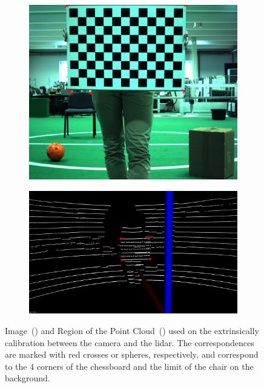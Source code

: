 \begin{figure}[!ht]
	\centering
	\begin{subfigure}[c]{0.39\textwidth}
		\includegraphics[width=\textwidth]{img/calibration/camera-extrinsic-calibration-points-draw.jpg}
		\caption{}
		\label{fig:extrinsic-calibration-correspondences:camera}
	\end{subfigure}
	\qquad
	\begin{subfigure}[c]{0.55\textwidth}
		\includegraphics[width=\textwidth]{img/calibration/lidar-extrinsic-calibration-points.png}
		\caption{}
		\label{fig:extrinsic-calibration-correspondences:lidar}
	\end{subfigure}
	\caption[Correspondences selected on the image and point cloud for extrinsic calibration between the two.]{Image~() and Region of the Point Cloud~() used on the extrinsically calibration between the camera and the \ac{lidar}. The correspondences are marked with red crosses or spheres, respectively, and correspond to the 4 corners of the chessboard and the limit of the chair on the background.}
	\label{fig:calibration-correspondences}
\end{figure}

